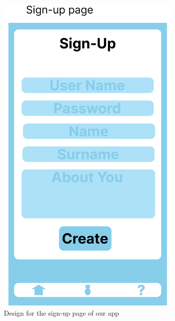 \begin{figure}
	\centering
	\begin{subfigure}[T]{0.4\linewidth}
		\includegraphics[width=\linewidth]{figures/sign_up.png}
		\caption{Design for the sign-up page of our app}
		\label{fig:sign_in}
	\end{subfigure}
	\hfill
	\begin{subfigure}[T]{0.4\linewidth}

\end{subfigure}
\end{figure}
